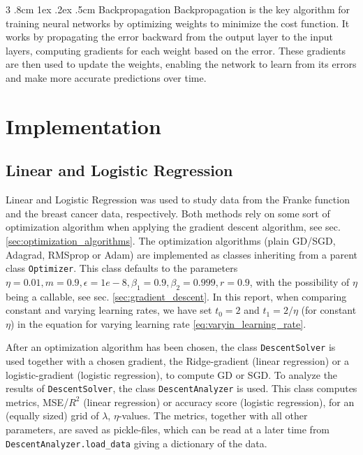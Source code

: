 \documentclass[%
reprint,s
amsmath,amssymb,
aps,
]{revtex4-2}
\makeatletter
\renewcommand{\subsubsection}{%
	\@startsection
	{subsubsection}%
	{3}%
	{\z@}%
	{.8cm \@plus1ex \@minus .2ex}%
	{.5cm}%
	{\normalfont\small\centering}%
}
\makeatother
\begin{document}
\subsubsection{Backpropagation}
Backpropagation is the key algorithm for training neural networks by optimizing weights to minimize the cost function. It works by propagating the error backward from the output layer to the input layers, computing gradients for each weight based on the error. These gradients are then used to update the weights, enabling the network to learn from its errors and make more accurate predictions over time.

\section{Implementation}
\subsection{Linear and Logistic Regression}
Linear and Logistic Regression was used to study data from the Franke function and the breast cancer data, respectively. Both methods rely on some sort of optimization algorithm when applying the gradient descent algorithm, see sec. \ref{sec:optimization_algorithms}. The optimization algorithms (plain GD/SGD, Adagrad, RMSprop or Adam) are implemented as classes inheriting from a parent class \texttt{Optimizer}. This class defaults to the parameters \(\eta=0.01, m=0.9, \epsilon=1e-8, \beta_1=0.9, \beta_2=0.999, r=0.9\), with the possibility of \(\eta\) being a callable, see sec. \ref{sec:gradient_descent}. In this report, when comparing constant and varying learning rates, we have set \(t_0 = 2\) and \(t_{1} = 2/\eta\) (for constant \(\eta\)) in the equation for varying learning rate \eqref{eq:varyin_learning_rate}.

After an optimization algorithm has been chosen, the class \texttt{DescentSolver} is used together with a chosen gradient, the Ridge-gradient (linear regression) or a logistic-gradient (logistic regression), to compute GD or SGD. To analyze the results of \texttt{DescentSolver}, the class \texttt{DescentAnalyzer} is used. This class computes metrics, MSE/\(R^2\) (linear regression) or accuracy score (logistic regression), for an (equally sized) grid of \(\lambda\), \(\eta\)-values. The metrics, together with all other parameters, are saved as pickle-files, which can be read at a later time from \texttt{DescentAnalyzer.load\_data} giving a dictionary of the data. 
\end{document}
